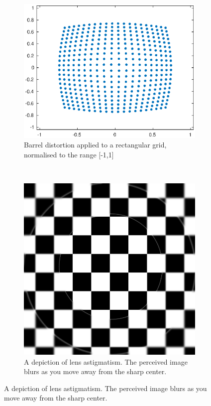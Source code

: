 \documentclass[12pt,a4paper,twoside,openright]{report}
\begin{document}
\begin{figure}[tbh]
\begin{subfigure}[t]{0.5\textwidth}
\centerline{\includegraphics[width=0.9\linewidth]{figs/post_distortion.eps}}
\caption{Barrel distortion applied to a rectangular grid, normalised to the range [-1,1]}
\label{barreldist}
\end{subfigure}
~
\begin{subfigure}[t]{0.5\textwidth}
\centerline{\includegraphics[width=0.7\linewidth]{figs/blur.png}}
\caption{A depiction of lens astigmatism. The perceived image blurs as you move away from the sharp center.}
\label{blurred}
\end{subfigure}
\end{figure} 
\end{document}
